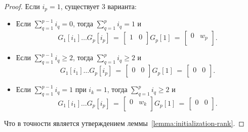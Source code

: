 \begin{proof}
  Если $i_p = 1$, существует $3$ варианта:
  \begin{itemize}
    \item Если $\sum_{q=1}^{p-1} i_q = 0$, тогда $\sum_{q=1}^{p} i_q = 1$ и
    \begin{equation*}
      G_1[i_1] \ldots G_p[i_p] \,=\, \left[
      \begin{array}{cc}
      1 & 0\\
      \end{array}
      \right]
      G_p[1] \,=\, \left[
      \begin{array}{cc}
      0 & w_p\\
      \end{array}
      \right].
    \end{equation*}
    \item Если $\sum_{q=1}^{p-1} i_q \geq 2$, тогда $\sum_{q=1}^{p} i_q\geq 2$ и
    \begin{equation*}
      G_1[i_1] \ldots G_p[i_p] \,=\, \left[
      \begin{array}{cc}
      0 & 0\\
      \end{array}
      \right] G_p[1] \,=\,
      \left[
      \begin{array}{cc}
      0 & 0\\
      \end{array}
      \right].
    \end{equation*}
    \item Если $\sum_{q=1}^{p-1}i_q = 1$ при $i_k = 1$, тогда $\sum_{q=1}^{p}i_q \geq 2$ и
    \begin{equation*}
      G_1[i_1] \ldots G_p[i_p] \,=\, \left[
      \begin{array}{cc}
      0 & w_k\\
      \end{array}
      \right]
      G_p[1] \, =\, \left[
      \begin{array}{cc}
      0 & 0\\
      \end{array}
      \right].
    \end{equation*}
  \end{itemize}
  Что в точности является утверждением леммы~\ref{lemma:initialization-rank}.
\end{proof}


